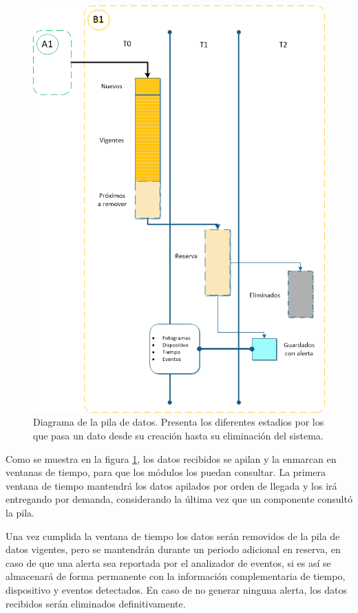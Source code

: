             \begin{figure}[ht!]
            	\centering
            	\includegraphics[width=0.8\linewidth]{imgs/03-Architecture/03-DataPool.png}
            	\caption[Diagrama de la pila de datos]{Diagrama de la pila de datos. Presenta los diferentes estadios por los que pasa un dato desde su creación hasta su eliminación del sistema.}
        	    \label{fig:PoolFlow}
            \end{figure}%
        
            Como se muestra en la figura \ref{fig:PoolFlow}, los datos recibidos se apilan y la enmarcan en ventanas de tiempo, para que los módulos los puedan consultar. La primera ventana de tiempo mantendrá los datos apilados por orden de llegada y los irá entregando por demanda, considerando la última vez que un componente consultó la pila. 
            
            Una vez cumplida la ventana de tiempo los datos serán removidos de la pila de datos vigentes, pero se mantendrán durante un periodo adicional en reserva, en caso de que una alerta sea reportada por el analizador de eventos, si es así se almacenará de forma permanente con la información complementaria de tiempo, dispositivo y eventos detectados. En caso de no generar ninguna alerta, los datos recibidos serán eliminados definitivamente.

